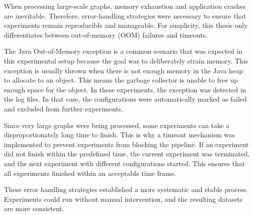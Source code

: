 When processing large-scale graphs, memory exhaustion and application crashes are inevitable. Therefore, error-handling strategies were necessary to ensure that experiments remain reproducible and manageable. For simplicity, this thesis only differentiates between out-of-memory (OOM) failures and timeouts. \par
The Java Out-of-Memory exception is a common scenario that was expected in this experimental setup because the goal was to deliberately strain memory. This exception is usually thrown when there is not enough memory in the Java heap to allocate to an object. This means the garbage collector is unable to free up enough space for the object. In these experiments, the exception was detected in the log files. In that case, the configurations were automatically marked as failed and excluded from further experiments. \par
Since very large graphs were being processed, some experiments can take a disproportionately long time to finish. This is why a timeout mechanism was implemented to prevent experiments from blocking the pipeline. If an experiment did not finish within the predefined time, the current experiment was terminated, and the next experiment with different configurations started. This ensures that all experiments finished within an acceptable time frame.  \par
These error handling strategies established a more systematic and stable process. Experiments could run without manual intervention, and the resulting datasets are more consistent.

 



